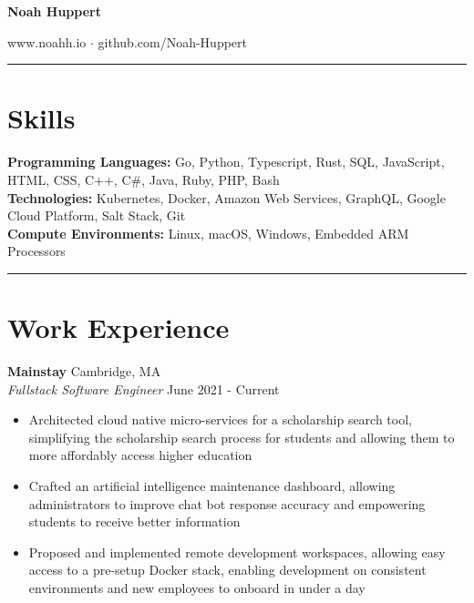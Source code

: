 \documentclass[10pt]{article}
\begin{document}

\centering
	{\huge\textbf{Noah Huppert}}
	\vspace{1ex}

	
	www.noahh.io $\cdot$ github.com/Noah-Huppert

	\rule{\columnwidth}{1pt}

\begin{flushleft}

\section{Skills}
    \textbf{Programming Languages:} Go, Python, Typescript, Rust, SQL, JavaScript, HTML, CSS, C++, C\#, Java, Ruby, PHP, Bash \\
	\textbf{Technologies:} Kubernetes, Docker, Amazon Web Services, GraphQL, Google Cloud Platform, Salt Stack, Git \\
	\textbf{Compute Environments:} Linux, macOS, Windows, Embedded ARM Processors

	\rule{\columnwidth}{0.4pt}

\section{Work Experience}
	\textbf{Mainstay} \hfill Cambridge, MA \\
	\textit{Fullstack Software Engineer} \hfill June 2021 - Current \\
    \begin{itemize}
        \item Architected cloud native micro-services for a scholarship search tool, simplifying the scholarship search process for students and allowing them to more affordably access higher education

		\item Crafted an artificial intelligence maintenance dashboard, allowing administrators to improve chat bot response accuracy and empowering students to receive better information

        \item Proposed and implemented remote development workspaces, allowing easy access to a pre-setup Docker stack, enabling development on consistent environments and new employees to onboard in under a day 
	\end{itemize}


\end{flushleft}
\end{document}
